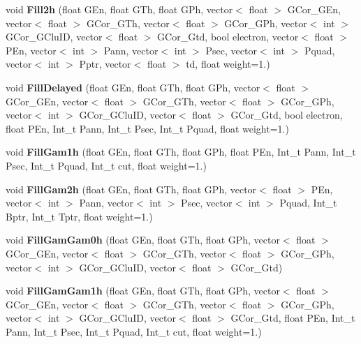 \begin{DoxyCompactItemize}
void {\bfseries Fill2h} (float G\+En, float G\+Th, float G\+Ph, vector$<$ float $>$ G\+Cor\+\_\+\+G\+En, vector$<$ float $>$ G\+Cor\+\_\+\+G\+Th, vector$<$ float $>$ G\+Cor\+\_\+\+G\+Ph, vector$<$ int $>$ G\+Cor\+\_\+\+G\+Clu\+ID, vector$<$ float $>$ G\+Cor\+\_\+\+Gtd, bool electron, vector$<$ float $>$ P\+En, vector$<$ int $>$ Pann, vector$<$ int $>$ Psec, vector$<$ int $>$ Pquad, vector$<$ int $>$ Pptr, vector$<$ float $>$ td, float weight=1.)
\item 
\mbox{\label{classhists_a506c5e4b0014fe8c5bab39bdc2d09d76}} 
void {\bfseries Fill\+Delayed} (float G\+En, float G\+Th, float G\+Ph, vector$<$ float $>$ G\+Cor\+\_\+\+G\+En, vector$<$ float $>$ G\+Cor\+\_\+\+G\+Th, vector$<$ float $>$ G\+Cor\+\_\+\+G\+Ph, vector$<$ int $>$ G\+Cor\+\_\+\+G\+Clu\+ID, vector$<$ float $>$ G\+Cor\+\_\+\+Gtd, bool electron, float P\+En, Int\+\_\+t Pann, Int\+\_\+t Psec, Int\+\_\+t Pquad, float weight=1.)
\item 
\mbox{\label{classhists_a978ae6d9269b5aa0a26365899d3047b2}} 
void {\bfseries Fill\+Gam1h} (float G\+En, float G\+Th, float G\+Ph, float P\+En, Int\+\_\+t Pann, Int\+\_\+t Psec, Int\+\_\+t Pquad, Int\+\_\+t cut, float weight=1.)
\item 
\mbox{\label{classhists_a37e85d4eeab8262c6809d003d83d220e}} 
void {\bfseries Fill\+Gam2h} (float G\+En, float G\+Th, float G\+Ph, vector$<$ float $>$ P\+En, vector$<$ int $>$ Pann, vector$<$ int $>$ Psec, vector$<$ int $>$ Pquad, Int\+\_\+t Bptr, Int\+\_\+t Tptr, float weight=1.)
\item 
\mbox{\label{classhists_a02f8be4691d9c9c5aae56b29144d4878}} 
void {\bfseries Fill\+Gam\+Gam0h} (float G\+En, float G\+Th, float G\+Ph, vector$<$ float $>$ G\+Cor\+\_\+\+G\+En, vector$<$ float $>$ G\+Cor\+\_\+\+G\+Th, vector$<$ float $>$ G\+Cor\+\_\+\+G\+Ph, vector$<$ int $>$ G\+Cor\+\_\+\+G\+Clu\+ID, vector$<$ float $>$ G\+Cor\+\_\+\+Gtd)
\item 
\mbox{\label{classhists_a7d1b75d24747c89c343d15c8826b3ecb}} 
void {\bfseries Fill\+Gam\+Gam1h} (float G\+En, float G\+Th, float G\+Ph, vector$<$ float $>$ G\+Cor\+\_\+\+G\+En, vector$<$ float $>$ G\+Cor\+\_\+\+G\+Th, vector$<$ float $>$ G\+Cor\+\_\+\+G\+Ph, vector$<$ int $>$ G\+Cor\+\_\+\+G\+Clu\+ID, vector$<$ float $>$ G\+Cor\+\_\+\+Gtd, float P\+En, Int\+\_\+t Pann, Int\+\_\+t Psec, Int\+\_\+t Pquad, Int\+\_\+t cut, float weight=1.)

\end{DoxyCompactItemize}
